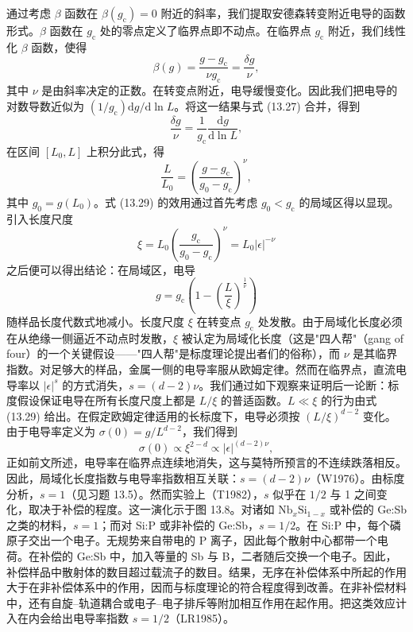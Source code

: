 通过考虑 $\beta$ 函数在 $\beta(g_{\mathrm{c}})=0$ 附近的斜率，我们提取安德森转变附近电导的函数形式。$\beta$ 函数在 $g_{\mathrm{c}}$ 处的零点定义了临界点即不动点。在临界点 $g_{\mathrm{c}}$ 附近，我们线性化 $\beta$ 函数，使得
\begin{equation*}
\beta(g)=\frac{g-g_{\mathrm{c}}}{\nu g_{\mathrm{c}}}=\frac{\delta g}{\nu},\tag{13.27}
\end{equation*}
其中 $\nu$ 是由斜率决定的正数。在转变点附近，电导缓慢变化。因此我们把电导的对数导数近似为 $(1/g_{\mathrm{c}})\mathrm{d}g/\mathrm{d}\ln L$。将这一结果与式 (13.27) 合并，得到
\begin{equation*}
\frac{\delta g}{\nu}=\frac{1}{g_{\mathrm{c}}}\frac{\mathrm{d}g}{\mathrm{d}\ln L},\tag{13.28}
\end{equation*}
在区间 $[L_{0},L]$ 上积分此式，得
\begin{equation*}
\frac{L}{L_{0}}=\left(\frac{g-g_{\mathrm{c}}}{g_{0}-g_{\mathrm{c}}}\right)^{\nu},\tag{13.29}
\end{equation*}
其中 $g_{0}=g(L_{0})$。式 (13.29) 的效用通过首先考虑 $g_{0}<g_{\mathrm{c}}$ 的局域区得以显现。引入长度尺度
\begin{equation*}
\xi=L_{0}\left(\frac{g_{\mathrm{c}}}{g_{0}-g_{\mathrm{c}}}\right)^{\nu}=L_{0}|\epsilon|^{-\nu}\tag{13.30}
\end{equation*}
之后便可以得出结论：在局域区，电导
\begin{equation*}
g=g_{\mathrm{c}}\left(1-\left(\frac{L}{\xi}\right)^{\frac{1}{\nu}}\right)\tag{13.31}
\end{equation*}
随样品长度代数式地减小。长度尺度 $\xi$ 在转变点 $g_{\mathrm{c}}$ 处发散。由于局域化长度必须在从绝缘一侧逼近不动点时发散，$\xi$ 被认定为局域化长度（这是"四人帮"（gang of four）的一个关键假设——"四人帮"是标度理论提出者们的俗称），而 $\nu$ 是其临界指数。对足够大的样品，金属一侧的电导率服从欧姆定律。然而在临界点，直流电导率以 $|\epsilon|^{s}$ 的方式消失，$s=(d-2)\nu$。我们通过如下观察来证明后一论断：标度假设保证电导在所有长度尺度上都是 $L/\xi$ 的普适函数。$L\ll\xi$ 的行为由式 (13.29) 给出。在假定欧姆定律适用的长标度下，电导必须按 $(L/\xi)^{d-2}$ 变化。由于电导率定义为 $\sigma(0)=g/L^{d-2}$，我们得到
\begin{equation*}
\sigma(0)\propto\xi^{2-d}\propto|\epsilon|^{(d-2)\nu},\tag{13.32}
\end{equation*}
正如前文所述，电导率在临界点连续地消失，这与莫特所预言的不连续跌落相反。因此，局域化长度指数与电导率指数相互关联：$s=(d-2)\nu$（W1976）。由标度分析，$s=1$（见习题 13.5）。然而实验上（T1982），$s$ 似乎在 $1/2$ 与 1 之间变化，取决于补偿的程度。这一演化示于图 13.8。对诸如 $\mathrm{Nb}_{x}\mathrm{Si}_{1-x}$ 或补偿的 Ge:Sb 之类的材料，$s=1$；而对 Si:P 或非补偿的 Ge:Sb，$s=1/2$。在 Si:P 中，每个磷原子交出一个电子。无规势来自带电的 P 离子，因此每个散射中心都带一个电荷。在补偿的 Ge:Sb 中，加入等量的 Sb 与 B，二者随后交换一个电子。因此，补偿样品中散射体的数目超过载流子的数目。结果，无序在补偿体系中所起的作用大于在非补偿体系中的作用，因而与标度理论的符合程度得到改善。在非补偿材料中，还有自旋--轨道耦合或电子--电子排斥等附加相互作用在起作用。把这类效应计入在内会给出电导率指数 $s=1/2$（LR1985）。

